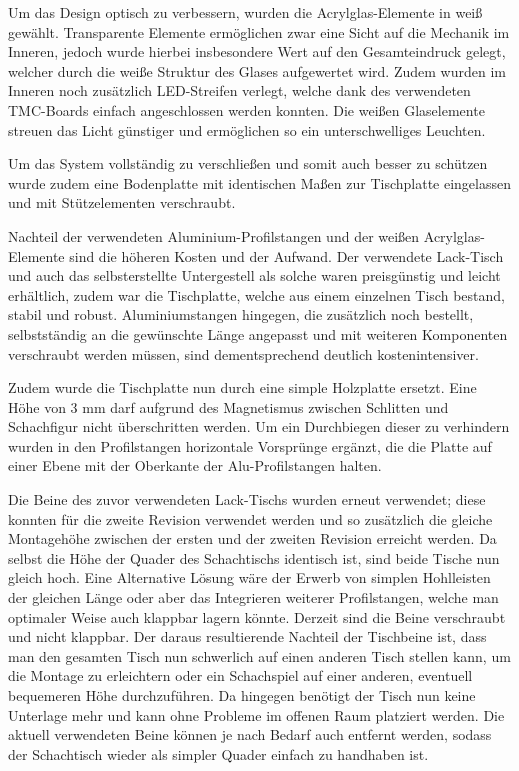 Um das Design optisch zu verbessern, wurden die Acrylglas-Elemente in
weiß gewählt. Transparente Elemente ermöglichen zwar eine Sicht auf die
Mechanik im Inneren, jedoch wurde hierbei insbesondere Wert auf den
Gesamteindruck gelegt, welcher durch die weiße Struktur des Glases
aufgewertet wird. Zudem wurden im Inneren noch zusätzlich LED-Streifen
verlegt, welche dank des verwendeten TMC-Boards einfach angeschlossen
werden konnten. Die weißen Glaselemente streuen das Licht günstiger und
ermöglichen so ein unterschwelliges Leuchten.

Um das System vollständig zu verschließen und somit auch besser zu
schützen wurde zudem eine Bodenplatte mit identischen Maßen zur
Tischplatte eingelassen und mit Stützelementen verschraubt.

Nachteil der verwendeten Aluminium-Profilstangen und der weißen
Acrylglas-Elemente sind die höheren Kosten und der Aufwand. Der
verwendete Lack-Tisch und auch das selbsterstellte Untergestell als
solche waren preisgünstig und leicht erhältlich, zudem war die
Tischplatte, welche aus einem einzelnen Tisch bestand, stabil und
robust. Aluminiumstangen hingegen, die zusätzlich noch bestellt,
selbstständig an die gewünschte Länge angepasst und mit weiteren
Komponenten verschraubt werden müssen, sind dementsprechend deutlich
kostenintensiver.

Zudem wurde die Tischplatte nun durch eine simple Holzplatte ersetzt.
Eine Höhe von 3 mm darf aufgrund des Magnetismus zwischen Schlitten und
Schachfigur nicht überschritten werden. Um ein Durchbiegen dieser zu
verhindern wurden in den Profilstangen horizontale Vorsprünge ergänzt,
die die Platte auf einer Ebene mit der Oberkante der Alu-Profilstangen
halten.

Die Beine des zuvor verwendeten Lack-Tischs wurden erneut verwendet;
diese konnten für die zweite Revision verwendet werden und so zusätzlich
die gleiche Montagehöhe zwischen der ersten und der zweiten Revision
erreicht werden. Da selbst die Höhe der Quader des Schachtischs
identisch ist, sind beide Tische nun gleich hoch. Eine Alternative
Lösung wäre der Erwerb von simplen Hohlleisten der gleichen Länge oder
aber das Integrieren weiterer Profilstangen, welche man optimaler Weise
auch klappbar lagern könnte. Derzeit sind die Beine verschraubt und
nicht klappbar. Der daraus resultierende Nachteil der Tischbeine ist,
dass man den gesamten Tisch nun schwerlich auf einen anderen Tisch
stellen kann, um die Montage zu erleichtern oder ein Schachspiel auf
einer anderen, eventuell bequemeren Höhe durchzuführen. Da hingegen
benötigt der Tisch nun keine Unterlage mehr und kann ohne Probleme im
offenen Raum platziert werden. Die aktuell verwendeten Beine können je
nach Bedarf auch entfernt werden, sodass der Schachtisch wieder als
simpler Quader einfach zu handhaben ist.

